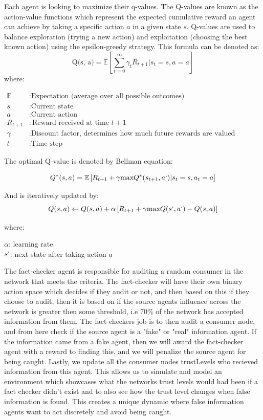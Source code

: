 \documentclass[twoside]{article}
\begin{document}
Each agent is looking to maximize their q-values. The Q-values are known as the action-value functions which represent the expected cumulative reward an agent can achieve by taking a specific action $a$ in a  given state $s$. Q-values are used to balance exploration (trying a new action) and exploitation (choosing the best known action) using the epsilon-greedy strategy. This formula can be denoted as:
\[
\text{Q(s, a)} = \mathbb{E}\left[\sum_{t=0}^{\infty}\gamma_{t}R_{t + 1} | s_{t} = s, a = a\right]
\]
where:

\[
\begin{aligned}
\mathbb{E} &: \text{Expectation (average over all possible outcomes)} \\
s &: \text{Current state} \\
a &: \text{Current action} \\
R_{t+1} &: \text{Reward received at time } t+1 \\
\gamma &: \text{Discount factor, determines how much future rewards are valued compared to immediate rewards} \\
t &: \text{Time step}
\end{aligned}
\]

The optimal Q-value is denoted by Bellman equation:

\[
Q^{*}(s, a) = \mathbb{E} \left[R_{t+1} + \gamma\text{max}Q^{*}(s_{t+1}, a`) | s_{t} = s, a_{t} = a\right]
\]

And is iteratively updated by:
\[
Q(s, a) \leftarrow Q(s, a) + \alpha \left[R_{t+1} + \gamma\text{max}Q(s`,a`) - Q(s, a)\right]
\]

where:

$\alpha$: learning rate\\
$s`$: next state after taking action $a$


The fact-checker agent is responsible for auditing a random consumer in the network that meets the criteria. The fact-checker will have their own binary action space which decides if they audit or not, and then based on this if they choose to audit, then it is based on if the source agents influence across the network is greater then some threshold, i.e 70\% of the network has accepted information from them. The fact-checkers job is to then audit a consumer node, and from here check if the source agent is a "fake" or "real" information agent. If the information came from a fake agent, then we will award the fact-checker agent with a reward to finding this, and we will penalize the source agent for being caught. Lastly, we update all the consumer nodes trustLevels who recieved information from this agent. This allows us to simulate and model an environment which showcases what the networks trust levels would had been if a fact checker didn't exist and to also see how the trust level changes when false information is found. This creates a unique dynamic where false information agents want to act discretely and avoid being caught.
\end{document}
